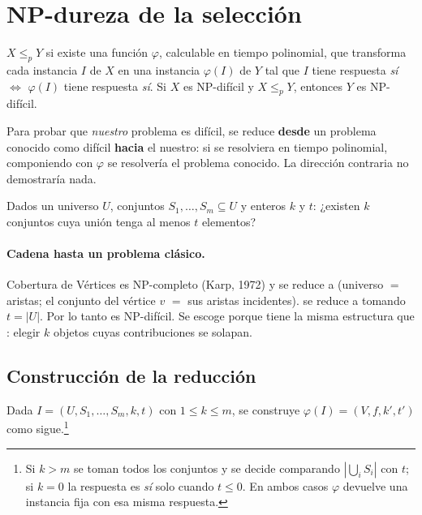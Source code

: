 \section{NP-dureza de la selección}\label{sec:reduccion}

\begin{definicion}
$X\le_p Y$ si existe una función $\varphi$, calculable en tiempo polinomial, que transforma cada
instancia $I$ de $X$ en una instancia $\varphi(I)$ de $Y$ tal que $I$ tiene respuesta \emph{sí}
$\iff$ $\varphi(I)$ tiene respuesta \emph{sí}. Si $X$ es NP-difícil y $X\le_p Y$, entonces $Y$ es
NP-difícil.
\end{definicion}

\begin{observacion}[Dirección]
Para probar que \emph{nuestro} problema es difícil, se reduce \textbf{desde} un problema conocido
como difícil \textbf{hacia} el nuestro: si \SEL{} se resolviera en tiempo polinomial, componiendo
con $\varphi$ se resolvería el problema conocido. La dirección contraria no demostraría nada.
\end{observacion}

\begin{definicion}
Dados un universo $U$, conjuntos $S_1,\dots,S_m\subseteq U$ y enteros $k$ y $t$: ¿existen $k$
conjuntos cuya unión tenga al menos $t$ elementos?
\end{definicion}

\paragraph{Cadena hasta un problema clásico.} Cobertura de Vértices es NP-completo (Karp, 1972) y se
reduce a \SC{} (universo $=$ aristas; el conjunto del vértice $v$ $=$ sus aristas incidentes).
\SC{} se reduce a \MC{} tomando $t=|U|$. Por lo tanto \MC{} es NP-difícil. Se escoge \MC{}
porque tiene la misma estructura que \SEL: elegir $k$ objetos cuyas contribuciones se solapan.

\subsection{Construcción de la reducción}

Dada $I=(U,S_1,\dots,S_m,k,t)$ con $1\le k\le m$, se construye $\varphi(I)=(V,f,k',t')$ como
sigue.\footnote{Si $k>m$ se toman todos los conjuntos y se decide comparando $|\bigcup_i S_i|$ con
$t$; si $k=0$ la respuesta es \emph{sí} solo cuando $t\le0$. En ambos casos $\varphi$ devuelve una
instancia fija con esa misma respuesta.}

